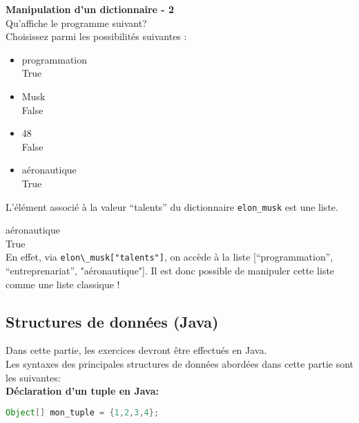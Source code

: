     \begin{Exercice}[5 minutes] \textbf{Manipulation d'un dictionnaire - 2}\\
      	Qu'affiche le programme suivant? \\
       
      	 
      	
      	Choisissez parmi les possibilités suivantes : \\
      	
      	\begin{itemize}
      	\item programmation \\
      	True\\
      	\item Musk \\
      	False\\
      	\item 48 \\
      	False\\
      	\item aéronautique \\
      	True \\
      	\end{itemize}
    
        \begin{conseil}
            L'élément associé à la valeur ``talents'' du dictionnaire \lstinline{elon_musk} est une liste.
        \end{conseil}
        
        \begin{solution}
            aéronautique \\
            True \\
            
            En effet, via \lstinline{elon\_musk["talents"]}, on accède à la liste [``programmation'', ``entreprenariat'', "aéronautique"]. Il est donc possible de manipuler cette liste comme une liste classique !
        \end{solution}
    \end{Exercice}
    
    \subsection{Structures de données (Java)}
    Dans cette partie, les exercices devront être effectués en Java. \\
    Les syntaxes des principales structures de données abordées dans cette partie sont les suivantes: \\
    \textbf{Déclaration d'un tuple en Java:}
     \begin{lstlisting}[language=Java]
              Object[] mon_tuple = {1,2,3,4}; \end{lstlisting} 
              
